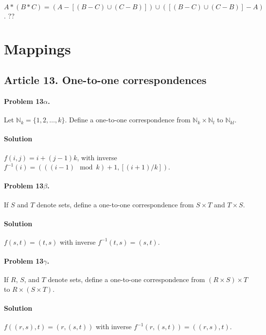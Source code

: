\paragraph{}
$A*(B*C) = (A-[(B-C) \cup (C-B)]) \cup ([(B-C) \cup (C-B)]-A)$. ??



\section{Mappings}


\subsection{Article 13. One-to-one correspondences}

\paragraph{Problem 13$\alpha$.}
Let $\mathbb{N}_k = \{ 1, 2, \dots, k \}$. Define a one-to-one correspondence
from $\mathbb{N}_k \times \mathbb{N}_l$ to $\mathbb{N}_{kl}$.

\paragraph*{Solution}
$f(i,j) = i + (j-1)k$, with inverse $f^{-1}(i) = (((i-1) \mod k)+1,
[(i+1)/k])$.

\paragraph{Problem 13$\beta$.}
If $S$ and $T$ denote sets, define a one-to-one correspondence from $S \times T$
and $T \times S$.

\paragraph*{Solution}
$f (s, t) = (t, s)$ with inverse $f^{-1}(t, s) = (s,t)$.

\paragraph{Problem 13$\gamma$.}
If $R$, $S$, and $T$ denote sets, define a one-to-one correspondence from
$(R \times S) \times T$ to $R \times (S \times T)$.

\paragraph*{Solution}
$f( (r,s), t) = (r, (s, t))$ with inverse $f^{-1}(r, (s,t)) = ((r,s), t)$.


